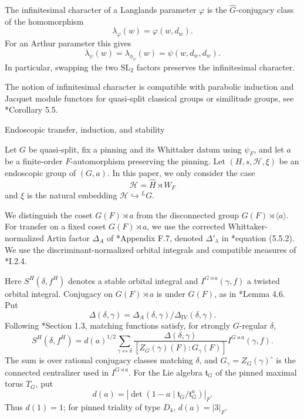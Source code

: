 \documentclass[12pt]{amsart}
\makeatletter
\renewcommand{\subsection}{\@startsection{subsection}{2}%
  \z@{.7\linespacing\@plus.5\linespacing}{.35\linespacing}%
  {\normalfont\bfseries\raggedright}}
\theoremstyle{definition}
\theoremstyle{plain}
\theoremstyle{remark}
\def\SL{\mathrm{SL}}
\newcommand{\cH}{\mathcal{H}}
\numberwithin{equation}{section}
\makeatother
\begin{document}
The infinitesimal character of a Langlands parameter $\varphi$ is the
$\widehat G$-conjugacy class of the homomorphism
\[
 \lambda_\varphi(w)=\varphi(w,d_w).
\]
For an Arthur parameter this gives
\begin{equation}\label{eq:infinitesimal-Arthur}
 \lambda_\psi(w)=\lambda_{\phi_\psi}(w)=\psi(w,d_w,d_w).
\end{equation}
In particular, swapping the two $\SL_2$ factors preserves the
infinitesimal character. 

The notion of infinitesimal character is compatible with parabolic induction and Jacquet module functors for quasi-split classical groups or similitude groups, see \cite{Xu2024-ArthurPacketsQuasisplitGSp2nGO2n}*{Corollary 5.5}.


\subsection{Endoscopic transfer, induction, and stability}\label{subsec:transfer-normalization}

Let $G$ be quasi-split, fix a pinning and its Whittaker datum
using $\psi_F$, and let $a$ be a finite-order $F$-automorphism
preserving the pinning. 
Let $(H, s, \cH, \xi)$ be an endoscopic group of $(G, a)$.
In this paper, we only consider the case $$\cH=\widehat H\rtimes W_F$$ and $\xi$ is the natural embedding $\cH\hookrightarrow{}^LG$.


We distinguish the coset $G(F) \rtimes a$
from the disconnected group $G(F)\rtimes\langle a \rangle$.
For transfer on a fixed coset $G(F) \rtimes a$, we use the corrected
Whittaker-normalized Artin factor $\Delta_A$ of
\cite{AtobeGanEtAl2025-LocalIntertwiningRelationsCoTemperedPackets}*{Appendix F.7},
denoted $\Delta'_\lambda$ in
\cite{KottwitzShelstad2012-SplittingInvariantsSignConventions}*{equation (5.5.2)}.
We use the discriminant-normalized orbital integrals and compatible measures of
\cite{MoeglinWaldspurger2016-StabilisationFormuleTracesTordue1}*{I.2.4}.

Here $S^H(\delta,f^H)$ denotes a stable orbital integral and
$I^{G \rtimes a}(\gamma,f)$ a twisted orbital integral.
Conjugacy on $G(F) \rtimes a$ is under $G(F)$, as in
\cite{Kaletha2022-LocalLanglandsConjecturesDisconnectedGroups}*{Lemma 4.6}.
Put
\[
 \Delta(\delta,\gamma)
       =\Delta_A(\delta,\gamma)/\Delta_{\mathrm{IV}}(\delta,\gamma).
\]
Following \cite{TakanashiEndoscopyLocal}*{Section 1.3}, matching functions
satisfy, for strongly $G$-regular $\delta$,
\[
 S^H(\delta,f^H)=d(a)^{1/2}
 \sum_{\gamma\leftrightarrow\delta}
 \frac{\Delta(\delta,\gamma)}{[Z_G(\gamma)(F):G_\gamma(F)]}
 I^{G \rtimes a}(\gamma,f).
\]
The sum is over rational conjugacy classes matching $\delta$, and
$G_\gamma=Z_G(\gamma)^\circ$ is the connected centralizer used in
$I^{G \rtimes a}$. For the Lie algebra $\mathfrak t_G$ of the pinned
maximal torus $T_G$, put
\[
 d(a)=
 \left|\det(1-a\mid\mathfrak t_G/\mathfrak t_G^a)\right|_F.
\]
Thus $d(1)=1$; for pinned triality of type $D_4$, $d(a)=|3|_F$.
\end{document}
